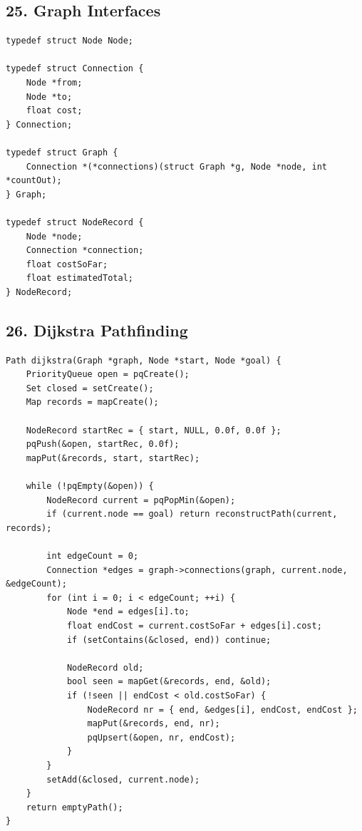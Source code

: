 \documentclass[10pt,letterpaper]{article}
\begin{document}
\subsection*{25. Graph Interfaces}
{}

\begin{verbatim}
typedef struct Node Node;

typedef struct Connection {
    Node *from;
    Node *to;
    float cost;
} Connection;

typedef struct Graph {
    Connection *(*connections)(struct Graph *g, Node *node, int *countOut);
} Graph;

typedef struct NodeRecord {
    Node *node;
    Connection *connection;
    float costSoFar;
    float estimatedTotal;
} NodeRecord;
\end{verbatim}

\subsection*{26. Dijkstra Pathfinding}
{}

\begin{verbatim}
Path dijkstra(Graph *graph, Node *start, Node *goal) {
    PriorityQueue open = pqCreate();
    Set closed = setCreate();
    Map records = mapCreate();

    NodeRecord startRec = { start, NULL, 0.0f, 0.0f };
    pqPush(&open, startRec, 0.0f);
    mapPut(&records, start, startRec);

    while (!pqEmpty(&open)) {
        NodeRecord current = pqPopMin(&open);
        if (current.node == goal) return reconstructPath(current, records);

        int edgeCount = 0;
        Connection *edges = graph->connections(graph, current.node, &edgeCount);
        for (int i = 0; i < edgeCount; ++i) {
            Node *end = edges[i].to;
            float endCost = current.costSoFar + edges[i].cost;
            if (setContains(&closed, end)) continue;

            NodeRecord old;
            bool seen = mapGet(&records, end, &old);
            if (!seen || endCost < old.costSoFar) {
                NodeRecord nr = { end, &edges[i], endCost, endCost };
                mapPut(&records, end, nr);
                pqUpsert(&open, nr, endCost);
            }
        }
        setAdd(&closed, current.node);
    }
    return emptyPath();
}
\end{verbatim}
\end{document}
